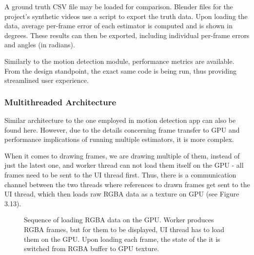\documentclass[11pt,english]{report}
\begin{document}
A ground truth CSV file may be loaded for comparison. Blender files for the project's synthetic videos use a script to export the truth data. Upon loading the data, average per-frame error of each estimator is computed and is shown in degrees. These results can then be exported, including individual per-frame errors and angles (in radians).

Similarly to the motion detection module, performance metrics are available. From the design standpoint, the exact same code is being run, thus providing streamlined user experience.

\subsubsection{Multithreaded Architecture}

Similar architecture to the one employed in motion detection app can also be found here. However, due to the details concerning frame transfer to GPU and performance implications of running multiple estimators, it is more complex.

When it comes to drawing frames, we are drawing multiple of them, instead of just the latest one, and worker thread can not load them itself on the GPU - all frames need to be sent to the UI thread first. Thus, there is a communication channel between the two threads where references to drawn frames get sent to the UI thread, which then loads raw RGBA data as a texture on GPU (see Figure 3.13).

\begin{figure}[!ht]
	\centering
	\caption{\centering Sequence of loading RGBA data on the GPU. Worker produces RGBA frames, but for them to be displayed, UI thread has to load them on the GPU. Upon loading each frame, the state of the it is switched from RGBA buffer to GPU texture.}
\end{figure}
\end{document}

